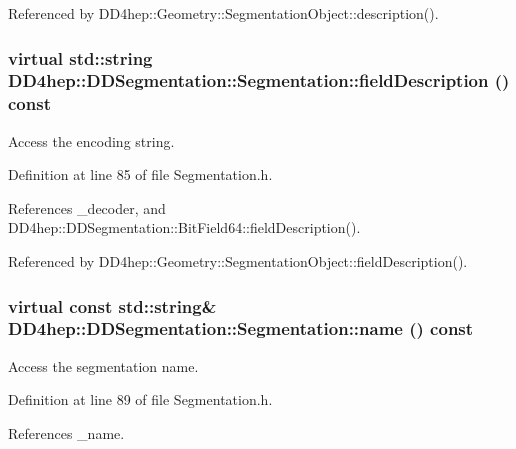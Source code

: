 Referenced by DD4hep::Geometry::SegmentationObject::description().\hypertarget{class_d_d4hep_1_1_d_d_segmentation_1_1_segmentation_ad22779a42ab1bacc7464c191322cb5d2}{
\subsubsection[{fieldDescription}]{\setlength{\rightskip}{0pt plus 5cm}virtual std::string DD4hep::DDSegmentation::Segmentation::fieldDescription () const}}
\label{class_d_d4hep_1_1_d_d_segmentation_1_1_segmentation_ad22779a42ab1bacc7464c191322cb5d2}


Access the encoding string. 

Definition at line 85 of file Segmentation.h.

References \_\-decoder, and DD4hep::DDSegmentation::BitField64::fieldDescription().

Referenced by DD4hep::Geometry::SegmentationObject::fieldDescription().\hypertarget{class_d_d4hep_1_1_d_d_segmentation_1_1_segmentation_a66085df678437a2cd3baeeded8580086}{
\subsubsection[{name}]{\setlength{\rightskip}{0pt plus 5cm}virtual const std::string\& DD4hep::DDSegmentation::Segmentation::name () const}}
\label{class_d_d4hep_1_1_d_d_segmentation_1_1_segmentation_a66085df678437a2cd3baeeded8580086}


Access the segmentation name. 

Definition at line 89 of file Segmentation.h.

References \_\-name.

